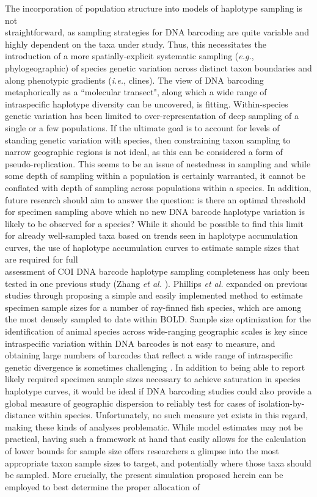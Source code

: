 \noindent The incorporation of population structure into models of haplotype sampling is not \\ straightforward, as sampling strategies for DNA barcoding are quite variable and highly dependent on the taxa under study. Thus, this necessitates the introduction of a more spatially-explicit systematic sampling (\textit{e.g.}, phylogeographic) of species genetic variation across distinct taxon boundaries and along phenotypic gradients (\textit{i.e.}, clines). The view of DNA barcoding metaphorically as a ``molecular transect", along which a wide range of intraspecific haplotype diversity can be uncovered, is fitting. Within-species genetic variation has been limited to over-representation of deep sampling of a single or a few populations. If the ultimate goal is to account for levels of standing genetic variation with species, then constraining taxon sampling to narrow geographic regions is not ideal, as this can be considered a form of pseudo-replication. This seems to be an issue of nestedness in sampling and while some depth of sampling within a population is certainly warranted, it cannot be conflated with depth of sampling across populations within a species. In addition, future research should aim to answer the question: is there an optimal threshold for specimen sampling above which no new DNA barcode haplotype variation is likely to be observed for a species? While it should be possible to find this limit for already well-sampled taxa based on trends seen in haplotype accumulation curves, the use of haplotype accumulation curves to estimate sample sizes that are required for full \\ assessment of COI DNA barcode haplotype sampling completeness has only been tested in one previous study (Zhang \textit{et al.} \cite{zhang2010estimating}). Phillips \textit{et al.} \cite{phillips2015exploration} expanded on previous studies through proposing a simple and easily implemented method to estimate specimen sample sizes for a number of ray-finned fish species, which are among the most densely sampled to date within BOLD. Sample size optimization for the identification of animal species across wide-ranging geographic scales is key since intraspecific variation within DNA barcodes is not easy to measure, and obtaining large numbers of barcodes that reflect a wide range of intraspecific genetic divergence is sometimes challenging \cite{bertolazzi2009learning}. In addition to being able to report likely required specimen sample sizes necessary to achieve saturation in species haplotype curves, it would be ideal if DNA barcoding studies could also provide a global measure of geographic dispersion to reliably test for cases of isolation-by-distance within species. Unfortunately, no such measure yet exists in this regard, making these kinds of analyses problematic. While model estimates may not be practical, having such a framework at hand that easily allows for the calculation of lower bounds for sample size offers researchers a glimpse into the most appropriate taxon sample sizes to target, and potentially where those taxa should be sampled. More crucially, the present simulation proposed herein can be employed to best determine the proper allocation of 